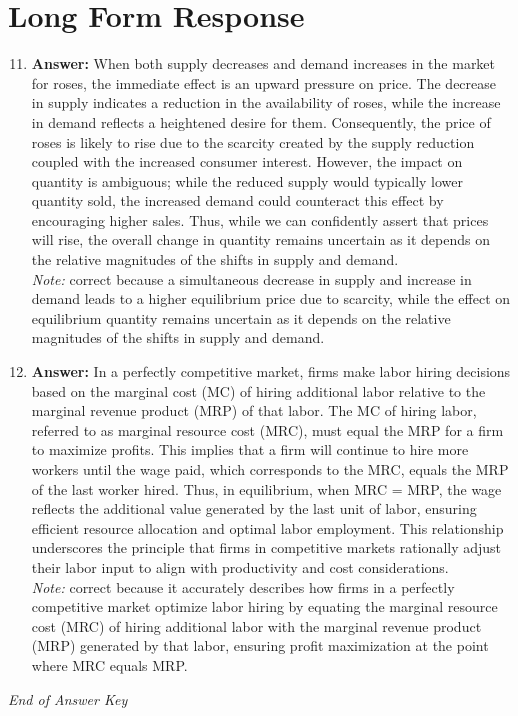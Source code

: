 \documentclass[12pt]{article}
\begin{document}
\section*{Long Form Response}
\begin{enumerate}[label=\arabic*.]
\setcounter{enumi}{10}
\item \textbf{Answer:} When both supply decreases and demand increases in the market for roses, the immediate effect is an upward pressure on price. The decrease in supply indicates a reduction in the availability of roses, while the increase in demand reflects a heightened desire for them. Consequently, the price of roses is likely to rise due to the scarcity created by the supply reduction coupled with the increased consumer interest. However, the impact on quantity is ambiguous; while the reduced supply would typically lower quantity sold, the increased demand could counteract this effect by encouraging higher sales. Thus, while we can confidently assert that prices will rise, the overall change in quantity remains uncertain as it depends on the relative magnitudes of the shifts in supply and demand.
\\ \textit{Note:} correct because a simultaneous decrease in supply and increase in demand leads to a higher equilibrium price due to scarcity, while the effect on equilibrium quantity remains uncertain as it depends on the relative magnitudes of the shifts in supply and demand.
\item \textbf{Answer:} In a perfectly competitive market, firms make labor hiring decisions based on the marginal cost (MC) of hiring additional labor relative to the marginal revenue product (MRP) of that labor. The MC of hiring labor, referred to as marginal resource cost (MRC), must equal the MRP for a firm to maximize profits. This implies that a firm will continue to hire more workers until the wage paid, which corresponds to the MRC, equals the MRP of the last worker hired. Thus, in equilibrium, when MRC = MRP, the wage reflects the additional value generated by the last unit of labor, ensuring efficient resource allocation and optimal labor employment. This relationship underscores the principle that firms in competitive markets rationally adjust their labor input to align with productivity and cost considerations.
\\ \textit{Note:} correct because it accurately describes how firms in a perfectly competitive market optimize labor hiring by equating the marginal resource cost (MRC) of hiring additional labor with the marginal revenue product (MRP) generated by that labor, ensuring profit maximization at the point where MRC equals MRP.
\end{enumerate}

\vfill
\noindent\textit{End of Answer Key}
\end{document}
